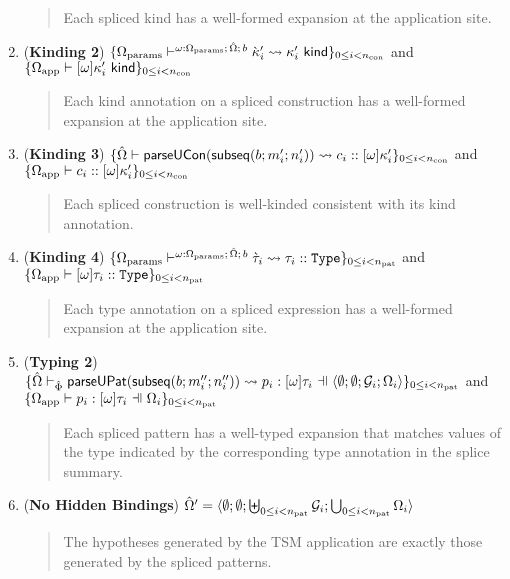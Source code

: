 \begin{theorem}
\begin{enumerate}
		\begin{quote}
			Each spliced kind has a well-formed expansion at the application site.
		\end{quote}
	\item (\textbf{Kinding 2}) $\{\Omega_\text{params} \vdash^{\omega : \Omega_\text{params};\,{\hat\Omega};\,b} {\grave\kappa}'_i \leadsto \kappa'_i~\mathsf{kind}\}_{0 \leq i < n_\text{con}}$ and $\{\Omega_\text{app} \vdash [\omega]\kappa'_i~\mathsf{kind}\}_{0 \leq i < n_\text{con}}$
		\begin{quote}
			Each kind annotation on a spliced construction has a well-formed expansion at the application site.
		\end{quote}
	\item (\textbf{Kinding 3}) $\{{\hat\Omega} \vdash \mathsf{parseUCon}(\mathsf{subseq}(b; m'_i; n'_i)) \leadsto c_i :: [\omega]\kappa'_i\}_{0 \leq i < n_\text{con}}$ and $\{\Omega_\text{app} \vdash c_i :: [\omega]\kappa'_i\}_{0 \leq i < n_\text{con}}$
		\begin{quote}
			Each spliced construction is well-kinded consistent with its kind annotation.
		\end{quote}
	\item (\textbf{Kinding 4}) $\{\Omega_\text{params} \vdash^{\omega : \Omega_\text{params};\,{\hat\Omega};\,b} \grave{\tau}_i \leadsto \tau_i :: \texttt{Type}\}_{0 \leq i < n_\text{pat}}$ and $\{\Omega_\text{app} \vdash [\omega]\tau_i :: \texttt{Type}\}_{0 \leq i < n_\text{pat}}$
		\begin{quote}
			Each type annotation on a spliced expression has a well-formed expansion at the application site.
		\end{quote}
  \item (\textbf{Typing 2}) $\sseq{\patExpandsP{\uOmegaEx{\emptyset}{\uG_i}{\emptyset}{\Omega_i}}{\uPhi}{\parseUPatF{\bsubseq{b}{m''_i}{n''_i}}}{p_i}{[\omega]\tau_i}}{\npat}$ and $\sseq{\patTypePC{\Omega_\text{app}}{\Omega_i}{p_i}{[\omega]\tau_i}}{\npat}$
  	\begin{quote}
  		Each spliced pattern has a well-typed expansion that matches values of the type indicated by the corresponding type annotation in the splice summary.
  	\end{quote}
      \item (\textbf{No Hidden Bindings}) ${\hat\Omega}'=\langle \emptyset; \emptyset; \biguplus_{0 \leq i < n_\text{pat}} \mathcal{G}_i; \bigcup_{0 \leq i < n_\text{pat}} \Omega_i \rangle$
      	\begin{quote}
      		The hypotheses generated by the TSM application are exactly those generated by the spliced patterns.
      	\end{quote}
\end{enumerate}
\end{theorem}
\endgroup

